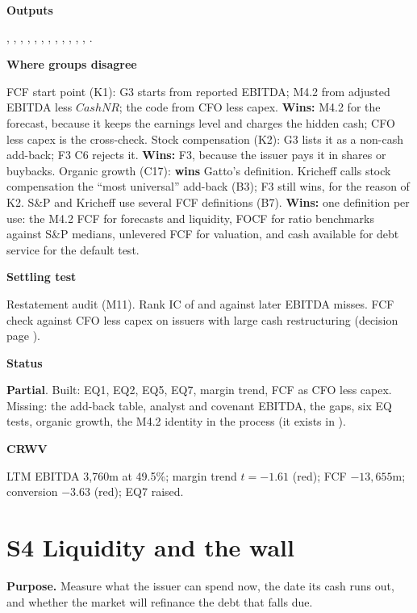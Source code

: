 \documentclass[11pt]{article}
\newcommand{\stpartial}{\textcolor{warn}{\textbf{Partial}}}
\newcommand{\fld}[1]{\par\medskip\noindent\textbf{\textcolor{steel}{#1}}\par\nopagebreak}
\begin{document}
\fld{Outputs} , , , , , , , , , , , , .

\fld{Where groups disagree} FCF start point (K1): G3 starts from reported EBITDA; M4.2 from adjusted EBITDA less $CashNR$; the code from CFO less capex. \textbf{Wins:} M4.2 for the forecast, because it keeps the earnings level and charges the hidden cash; CFO less capex is the cross-check. Stock compensation (K2): G3 lists it as a non-cash add-back; F3 C6 rejects it. \textbf{Wins:} F3, because the issuer pays it in shares or buybacks. Organic growth (C17): \textbf{wins} Gatto's definition. Kricheff calls stock compensation the ``most universal'' add-back (B3); F3 still wins, for the reason of K2. S\&P and Kricheff use several FCF definitions (B7). \textbf{Wins:} one definition per use: the M4.2 FCF for forecasts and liquidity, FOCF for ratio benchmarks against S\&P medians, unlevered FCF for valuation, and cash available for debt service for the default test.

\fld{Settling test} Restatement audit (M11). Rank IC of  and  against later EBITDA misses. FCF check against CFO less capex on issuers with large cash restructuring (decision page ).

\fld{Status} \stpartial. Built: EQ1, EQ2, EQ5, EQ7, margin trend, FCF as CFO less capex. Missing: the add-back table, analyst and covenant EBITDA, the gaps, six EQ tests, organic growth, the M4.2 identity in the process (it exists in ).

\fld{CRWV} LTM EBITDA 3,760m at 49.5\%; margin trend $t = -1.61$ (red); FCF $-13{,}655$m; conversion $-3.63$ (red); EQ7 raised.
\section{S4 Liquidity and the wall}\label{s4}

\textbf{Purpose.} Measure what the issuer can spend now, the date its cash runs out, and whether the market will refinance the debt that falls due.
\end{document}
